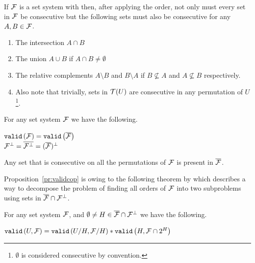 \begin{observation}[{\cite[Sec.~3]{mm96}}]
  If ${\cal F}$ is a set system with \COP then, after applying the \COP
  order, not only must every set in ${\cal F}$ be consecutive but the
  following sets must also be consecutive for any $A, B \in {\cal F}$.
\begin{enumerate}
  \item The intersection $A \cap B$ 
  \item The union $A \cup B$ if $A \cap B \ne \emptyset$
  \item The relative complements $A \setminus B$ and $B \setminus A$
    if $B \nsubseteq A$ and $A \nsubseteq B$ respectively.
  \item Also note that trivially, sets in ${\cal T}(U)$ are consecutive in
    any permutation of $U$\footnote{$\emptyset$ is considered
      consecutive by convention.}.
\end{enumerate}
\end{observation}


\begin{theoremsansproof}[{\cite[Th.~3,6]{mm96}}]
  \label{th:validcop}
  For any set system ${\cal F}$ we have the following. \par
  \centering
    ${\tt valid}\left({\cal F}\right) = {\tt valid}\left(\overline{{\cal F}}\right)$ \\
    ${\cal F}^{\bot} = \overline{{\cal F}^{\bot}} = (\overline{{\cal F}})^{\bot}$
\end{theoremsansproof}

\begin{proposition}
  \label{pr:validcop}
  Any set that is consecutive on all the \COP permutations of ${\cal F}$ is
  present in $\overline{{\cal F}}$.
\end{proposition}

Proposition~\ref{pr:validcop} is owing to the following theorem by
which \cite{mm96} describes a way to decompose the problem of finding
all \COP orders of ${\cal F}$ into two subproblems using sets in
$\overline{{\cal F}} \cap {\cal F}^{\bot}$.

\begin{theoremsansproof}[{\cite[Th.~7]{mm96}}]
  \label{th:mmdecomp}
  For any set system ${\cal F}$, and $\emptyset \ne H \in \overline{{\cal F}}
  \cap {\cal F}^{\bot}$ we have the following.\par
  \centering
  ${\tt valid}\left(U,{\cal F}\right) = {\tt valid}\left(U/H,{\cal F}/H\right) * {\tt valid}\left(H,{\cal F} \cap 2^H\right)$
\end{theoremsansproof}

\def \ff {\overline{\cF} \cap \cF^{\bot}}

